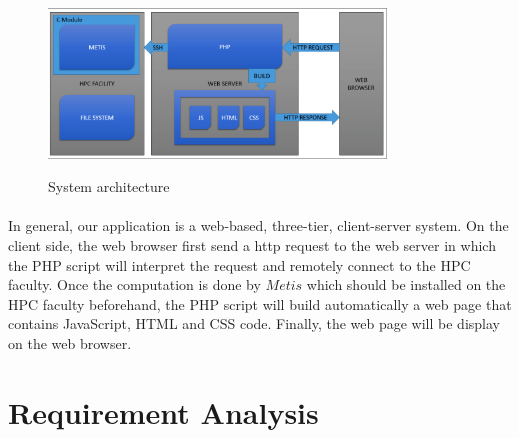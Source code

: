 \documentclass{cranfieldChart}
\begin{document}
\begin{figure}[h]
\centering
\includegraphics[width=0.8\textwidth]{ressources/architect}
\label{architect}
\caption{System architecture}
\end{figure}

\paragraph{}
In general, our application is a web-based, three-tier, client-server system. On the client side, the web browser first send a http request to the web server in which the PHP script will interpret the request and remotely connect to the HPC faculty. Once the computation is done by $Metis$ which should be installed on the HPC faculty beforehand, the PHP script will build automatically a web page that contains JavaScript, HTML and CSS code. Finally, the web page will be display on the web browser. 

\section{Requirement Analysis}
\end{document}
